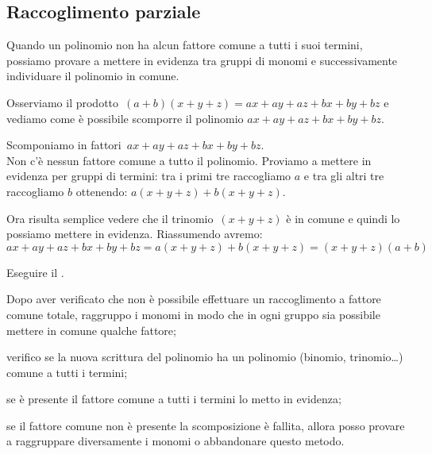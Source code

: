 % 

\subsection{Raccoglimento parziale}
\label{subsec:divpol_raccoglimentoparziale}

Quando un polinomio non ha alcun fattore comune a tutti i suoi termini, 
possiamo provare a mettere in evidenza tra gruppi di monomi
e successivamente individuare il polinomio in comune.

Osserviamo il prodotto~\((a+b)(x+y+z)=ax+ay+az+bx+by+bz\) e
vediamo come è possibile scomporre il polinomio 
\(ax+ay+az+bx+by+bz\).

\begin{esempio}{}{}
Scomponiamo in fattori~\(ax+ay+az+bx+by+bz\). \\

Non c'è nessun fattore comune a tutto il polinomio.
Proviamo a mettere in evidenza per gruppi di termini: tra i primi tre 
raccogliamo \(a\) e tra gli altri tre raccogliamo \(b\) ottenendo:
\(a(x+y+z)+b(x+y+z)\). 

Ora risulta semplice vedere che il trinomio~\((x+y+z)\) è in comune e 
quindi lo possiamo mettere in evidenza. Riassumendo avremo:
\[ax+ay+az+bx+by+bz=a(x+y+z)+b(x+y+z)=(x+y+z)(a+b)\]
\end{esempio}

\begin{procedura}{}{}
Eseguire il .
\begin{enumeratea}
\item Dopo aver verificato che non è possibile effettuare un 
raccoglimento a fattore comune totale, raggruppo i monomi in modo che 
in ogni gruppo sia possibile mettere in comune qualche fattore;
\item verifico se la nuova scrittura del polinomio ha un polinomio 
(binomio, trinomio\ldots) comune a tutti i termini;
\item se è presente il fattore comune a tutti i termini lo metto in 
evidenza;
\item se il fattore comune non è presente la scomposizione è fallita, 
allora posso provare a raggruppare diversamente i monomi o abbandonare 
questo metodo.
\end{enumeratea}
\end{procedura}

